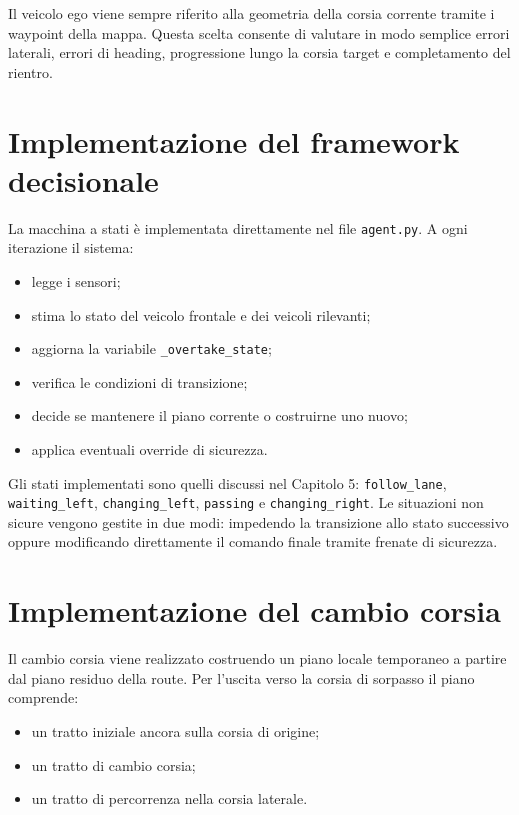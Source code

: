 Il veicolo ego viene sempre riferito alla geometria della corsia corrente tramite i waypoint della mappa. Questa scelta consente di valutare in modo semplice errori laterali, errori di heading, progressione lungo la corsia target e completamento del rientro.

\section{Implementazione del framework decisionale}

La macchina a stati è implementata direttamente nel file \texttt{agent.py}. A ogni iterazione il sistema:

\begin{itemize}
    \item legge i sensori;
    \item stima lo stato del veicolo frontale e dei veicoli rilevanti;
    \item aggiorna la variabile \texttt{\_overtake\_state};
    \item verifica le condizioni di transizione;
    \item decide se mantenere il piano corrente o costruirne uno nuovo;
    \item applica eventuali override di sicurezza.
\end{itemize}

Gli stati implementati sono quelli discussi nel Capitolo 5: \texttt{follow\_lane}, \texttt{waiting\_left}, \texttt{changing\_left}, \texttt{passing} e \texttt{changing\_right}. Le situazioni non sicure vengono gestite in due modi: impedendo la transizione allo stato successivo oppure modificando direttamente il comando finale tramite frenate di sicurezza.

\section{Implementazione del cambio corsia}

Il cambio corsia viene realizzato costruendo un piano locale temporaneo a partire dal piano residuo della route. Per l'uscita verso la corsia di sorpasso il piano comprende:

\begin{itemize}
    \item un tratto iniziale ancora sulla corsia di origine;
    \item un tratto di cambio corsia;
    \item un tratto di percorrenza nella corsia laterale.
\end{itemize}


